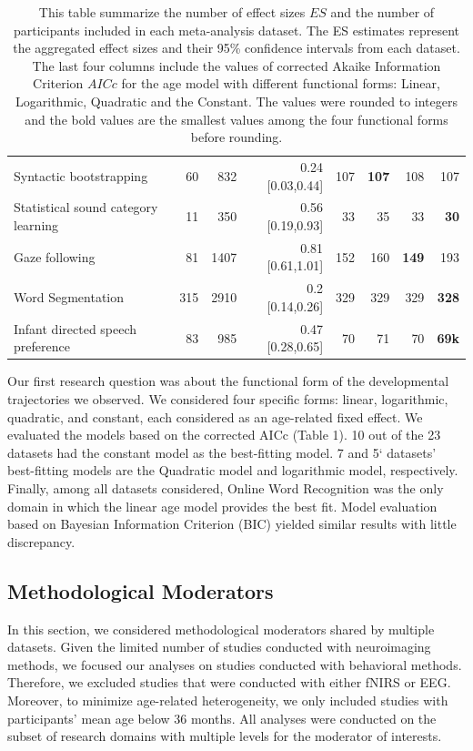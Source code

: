 \documentclass[10pt, letterpaper]{article}
\begin{document}
\begin{table}[ht]
\begin{tabular}{l|r|r|r|r|r|r|r}
Syntactic bootstrapping & 60 & 832 & 0.24 [0.03,0.44] & 107 & \textbf{107} & 108 & 107\\
Statistical sound category learning & 11 & 350 & 0.56 [0.19,0.93]& 33 & 35 & 33 & \textbf{30}\\
Gaze following & 81 & 1407 & 0.81 [0.61,1.01] & 152 & 160 & \textbf{149} & 193\\
Word Segmentation & 315 & 2910 & 0.2 [0.14,0.26] & 329 & 329 & 329 & \textbf{328}\\
Infant directed speech preference & 83 & 985 & 0.47 [0.28,0.65] & 70 & 71 & 70 & \textbf{69k}\\
\hline
\end{tabular}
\caption{\label{demo-table}This table summarize the number of effect sizes \(ES\) and the number of participants included in each meta-analysis dataset. The ES estimates represent the aggregated effect sizes and their 95\% confidence intervals from each dataset. The last four columns include the values of corrected Akaike Information Criterion \(AICc\) for the age model with different functional forms: Linear, Logarithmic, Quadratic and the Constant. The values were rounded to integers and the bold values are the smallest values among the four functional forms before rounding.}
\end{table}

Our first research question was about the functional form of the
developmental trajectories we observed. We considered four specific
forms: linear, logarithmic, quadratic, and constant, each considered as
an age-related fixed effect. We evaluated the models based on the
corrected AICc (Table 1). 10 out of the 23 datasets had the constant
model as the best-fitting model. 7 and 5` datasets' best-fitting models
are the Quadratic model and logarithmic model, respectively. Finally,
among all datasets considered, Online Word Recognition was the only
domain in which the linear age model provides the best fit. Model
evaluation based on Bayesian Information Criterion (BIC) yielded similar
results with little discrepancy.

\hypertarget{methodological-moderators}{%
\subsection{Methodological Moderators}\label{methodological-moderators}}

In this section, we considered methodological moderators shared by
multiple datasets. Given the limited number of studies conducted with
neuroimaging methods, we focused our analyses on studies conducted with
behavioral methods. Therefore, we excluded studies that were conducted
with either fNIRS or EEG. Moreover, to minimize age-related
heterogeneity, we only included studies with participants' mean age
below 36 months. All analyses were conducted on the subset of research
domains with multiple levels for the moderator of interests.
\end{document}
